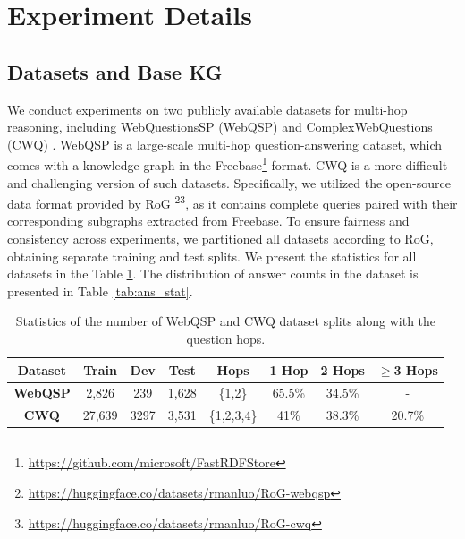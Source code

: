 \documentclass[11pt]{article}
\begin{document}
\section{Experiment Details}
\label{sec:exp_detail}
\subsection{Datasets and Base KG}
We conduct experiments on two publicly available datasets for multi-hop reasoning, including WebQuestionsSP (WebQSP) \cite{yih-etal-2016-value} and ComplexWebQuestions (CWQ) \cite{talmor-berant-2018-web}. WebQSP is a large-scale multi-hop question-answering dataset, which comes with a knowledge graph in the Freebase\footnote{\url{https://github.com/microsoft/FastRDFStore}} format. CWQ is a more difficult and challenging version of such datasets. Specifically, we utilized the open-source data format provided by RoG \cite{luo2024reasoning}\footnote{\url{https://huggingface.co/datasets/rmanluo/RoG-webqsp}}\footnote{\url{https://huggingface.co/datasets/rmanluo/RoG-cwq}}, as it contains complete queries paired with their corresponding subgraphs extracted from Freebase. To ensure fairness and consistency across experiments, we partitioned all datasets according to RoG, obtaining separate training and test splits. We present the statistics for all datasets in the Table \ref{tab:data_stat}. The distribution of answer counts in the dataset is presented in Table \ref{tab:ans_stat}. 

\begin{table}[t]
\centering
\renewcommand{\arraystretch}{1.15} %
\setlength{\tabcolsep}{5pt} 

\begin{tabular}{c|ccccccc}
\hline
{\textbf{Dataset}} & {\textbf{Train}} & {\textbf{Dev}} & {\textbf{Test}} & \textbf{Hops} & \textbf{1 Hop} & \textbf{2 Hops} & \textbf{$\geq$3 Hops} \\

\hline
\textbf{WebQSP}    & 2,826 & 239 & 1,628 & \{1,2\} & 65.5\% & 34.5\% & - \\
\textbf{CWQ}  & 27,639 & 3297 & 3,531 & \{1,2,3,4\} & 41\% & 38.3\% & 20.7\% \\
\hline
\end{tabular}
\caption{Statistics of the number of WebQSP and CWQ dataset splits along with the question hops.}
\label{tab:data_stat}
\end{table}
\end{document}
